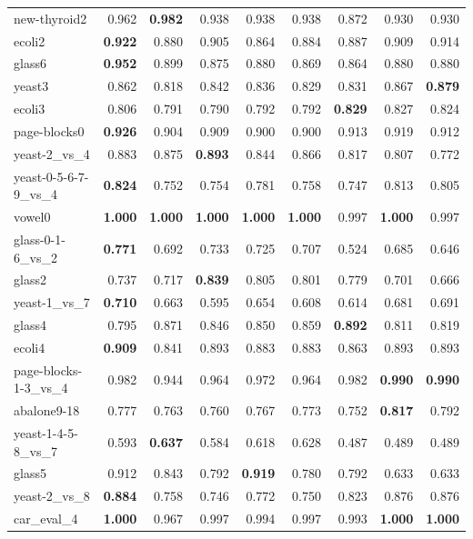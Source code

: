 \begin{table}[!htbp]
{\begin{tabular}{lrrrrrrrr}
  	new-thyroid2 & 0.962 & \textbf{0.982} & 0.938 & 0.938 & 0.938 & 0.872 & 0.930 & 0.930 \\
  	ecoli2 & \textbf{0.922} & 0.880 & 0.905 & 0.864 & 0.884 & 0.887 & 0.909 & 0.914 \\
  	glass6 & \textbf{0.952} & 0.899 & 0.875 & 0.880 & 0.869 & 0.864 & 0.880 & 0.880 \\
  	yeast3 & 0.862 & 0.818 & 0.842 & 0.836 & 0.829 & 0.831 & 0.867 & \textbf{0.879} \\
  	ecoli3 & 0.806 & 0.791 & 0.790 & 0.792 & 0.792 & \textbf{0.829} & 0.827 & 0.824 \\
  	page-blocks0 & \textbf{0.926} & 0.904 & 0.909 & 0.900 & 0.900 & 0.913 & 0.919 & 0.912 \\
  	yeast-2\_vs\_4 & 0.883 & 0.875 & \textbf{0.893} & 0.844 & 0.866 & 0.817 & 0.807 & 0.772 \\
  	yeast-0-5-6-7-9\_vs\_4 & \textbf{0.824} & 0.752 & 0.754 & 0.781 & 0.758 & 0.747 & 0.813 & 0.805 \\
  	vowel0 & \textbf{1.000} & \textbf{1.000} & \textbf{1.000} & \textbf{1.000} & \textbf{1.000} & 0.997 & \textbf{1.000} & 0.997 \\
  	glass-0-1-6\_vs\_2 & \textbf{0.771} & 0.692 & 0.733 & 0.725 & 0.707 & 0.524 & 0.685 & 0.646 \\
  	glass2 & 0.737 & 0.717 & \textbf{0.839} & 0.805 & 0.801 & 0.779 & 0.701 & 0.666 \\
  	yeast-1\_vs\_7 & \textbf{0.710} & 0.663 & 0.595 & 0.654 & 0.608 & 0.614 & 0.681 & 0.691 \\
  	glass4 & 0.795 & 0.871 & 0.846 & 0.850 & 0.859 & \textbf{0.892} & 0.811 & 0.819 \\
  	ecoli4 & \textbf{0.909} & 0.841 & 0.893 & 0.883 & 0.883 & 0.863 & 0.893 & 0.893 \\
  	page-blocks-1-3\_vs\_4 & 0.982 & 0.944 & 0.964 & 0.972 & 0.964 & 0.982 & \textbf{0.990} & \textbf{0.990} \\
  	abalone9-18 & 0.777 & 0.763 & 0.760 & 0.767 & 0.773 & 0.752 & \textbf{0.817} & 0.792 \\
  	yeast-1-4-5-8\_vs\_7 & 0.593 & \textbf{0.637} & 0.584 & 0.618 & 0.628 & 0.487 & 0.489 & 0.489 \\
  	glass5 & 0.912 & 0.843 & 0.792 & \textbf{0.919} & 0.780 & 0.792 & 0.633 & 0.633 \\
  	yeast-2\_vs\_8 & \textbf{0.884} & 0.758 & 0.746 & 0.772 & 0.750 & 0.823 & 0.876 & 0.876 \\
  	car\_eval\_4 & \textbf{1.000} & 0.967 & 0.997 & 0.994 & 0.997 & 0.993 & \textbf{1.000} & \textbf{1.000} \\

\end{tabular}}
\end{table}
